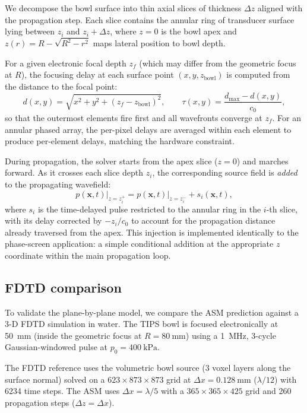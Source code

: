 \documentclass[11pt]{article}
\begin{document}
We decompose the bowl surface into thin axial slices of thickness
$\Delta z$ aligned with the propagation step.  Each slice contains the
annular ring of transducer surface lying between $z_i$ and
$z_i + \Delta z$, where $z = 0$ is the bowl apex and
$z(r) = R - \sqrt{R^2 - r^2}$ maps lateral position to bowl depth.

For a given electronic focal depth $z_f$ (which may differ from the
geometric focus at $R$), the focusing delay at each surface point
$(x, y, z_{\mathrm{bowl}})$ is computed from the distance to the
focal point:
\begin{equation}
  d(x,y) = \sqrt{x^2 + y^2 + (z_f - z_{\mathrm{bowl}})^2},
  \qquad
  \tau(x,y) = \frac{d_{\max} - d(x,y)}{c_0},
  \label{eq:bowl_delay}
\end{equation}
so that the outermost elements fire first and all wavefronts converge
at $z_f$.  For an annular phased array, the per-pixel delays are
averaged within each element to produce per-element delays, matching
the hardware constraint.

During propagation, the solver starts from the apex slice
($z = 0$) and marches forward.  As it crosses each slice depth $z_i$,
the corresponding source field is \emph{added} to the propagating
wavefield:
\begin{equation}
  p(\mathbf{x}, t)\big|_{z = z_i^+}
  = p(\mathbf{x}, t)\big|_{z = z_i^-}
  + s_i(\mathbf{x}, t),
\end{equation}
where $s_i$ is the time-delayed pulse restricted to the annular ring
in the $i$-th slice, with its delay corrected by $-z_i/c_0$ to account
for the propagation distance already traversed from the apex.  This
injection is implemented identically to the phase-screen application:
a simple conditional addition at the appropriate $z$ coordinate within
the main propagation loop.

\subsection{FDTD comparison}
\label{sec:bowl:results}

To validate the plane-by-plane model, we compare the ASM prediction
against a 3-D FDTD simulation in water.  The TIPS bowl is focused
electronically at \SI{50}{\milli\meter} (inside the geometric focus at
$R = \SI{80}{\milli\meter}$) using a \SI{1}{\mega\hertz}, 3-cycle
Gaussian-windowed pulse at $p_0 = \SI{400}{\kilo\pascal}$.

The FDTD reference uses the volumetric bowl source (3 voxel layers
along the surface normal) solved on a $623 \times 873 \times 873$ grid
at $\Delta x = \SI{0.128}{\milli\meter}$ ($\lambda/12$) with 6234 time
steps.  The ASM uses $\Delta x = \lambda/5$ with a
$365 \times 365 \times 425$ grid and 260 propagation steps
($\Delta z = \Delta x$).
\end{document}
